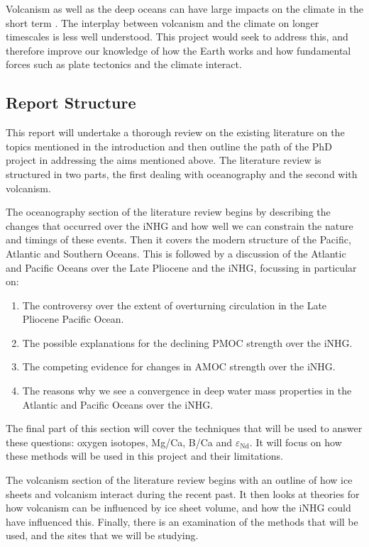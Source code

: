 Volcanism as well as the deep oceans can have large impacts on the climate in the short term \citep{rampinoClimateVolcanismFeedbackToba1993}. The interplay between volcanism and the climate on longer timescales is less well understood. This project would seek to address this, and therefore improve our knowledge of how the Earth works and how fundamental forces such as plate tectonics and the climate interact.

\subsection{Report Structure}

This report will undertake a thorough review on the existing literature on the topics mentioned in the introduction and then outline the path of the PhD project in addressing the aims mentioned above. The literature review is structured in two parts, the first dealing with oceanography and the second with volcanism. 

The oceanography section of the literature review begins by describing the changes that occurred over the iNHG and how well we can constrain the nature and timings of these events. Then it covers the modern structure of the Pacific, Atlantic and Southern Oceans. This is followed by a discussion of the Atlantic and Pacific Oceans over the Late Pliocene and the iNHG, focussing in particular on:

\begin{enumerate}
	\item The controversy over the extent of overturning circulation in the Late Pliocene Pacific Ocean.
	\item The possible explanations for the declining PMOC strength over the iNHG.
	\item The competing evidence for changes in AMOC strength over the iNHG.
	\item The reasons why we see a convergence in deep water mass properties in the Atlantic and Pacific Oceans over the iNHG.
\end{enumerate}

The final part of this section will cover the techniques that will be used to answer these questions: oxygen isotopes, Mg/Ca, B/Ca and $\varepsilon_{\text{Nd}}$. It will focus on how these methods will be used in this project and their limitations.

The volcanism section of the literature review begins with an outline of how ice sheets and volcanism interact during the recent past. It then looks at theories for how volcanism can be influenced by ice sheet volume, and how the iNHG could have influenced this. Finally, there is an examination of the methods that will be used, and the sites that we will be studying. 

